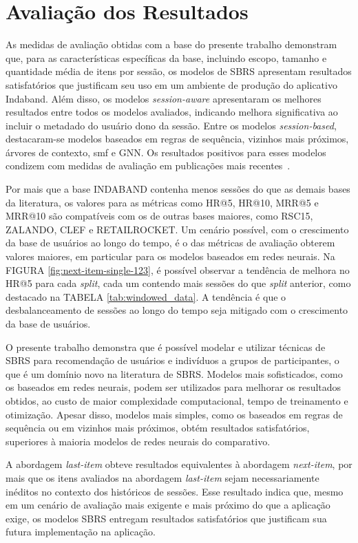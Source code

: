 \section{Avaliação dos Resultados}

As medidas de avaliação obtidas com a base do presente trabalho demonstram que,
para as características específicas da base, incluindo escopo, tamanho e
quantidade média de itens por sessão, os modelos de SBRS apresentam resultados
satisfatórios que justificam seu uso em um ambiente de produção do aplicativo
Indaband. Além disso, os modelos \textit{session-aware} apresentaram os melhores
resultados entre todos os modelos avaliados, indicando melhora significativa ao
incluir o metadado do usuário dono da sessão. Entre os modelos
\textit{session-based}, destacaram-se modelos baseados em regras de sequência,
vizinhos mais próximos, árvores de contexto, smf e GNN.  Os resultados positivos para esses modelos
condizem com medidas de avaliação em publicações mais
recentes~\cite{shehzad2024performance}.

Por mais que a base INDABAND contenha menos sessões do que as demais bases da
literatura, os valores para as métricas como HR@5, HR@10, MRR@5 e MRR@10 são
compatíveis com os de outras bases maiores, como RSC15, ZALANDO, CLEF e
RETAILROCKET. Um cenário possível, com o crescimento da base de usuários ao
longo do tempo, é o das métricas de avaliação obterem valores maiores, em
particular para os modelos baseados em redes neurais. Na FIGURA
\ref{fig:next-item-single-123}, é possível observar a tendência de melhora no
HR@5 para cada \textit{split}, cada um contendo mais sessões do que
\textit{split} anterior, como destacado na TABELA \ref{tab:windowed_data}. A
tendência é que o desbalanceamento de sessões ao longo do tempo seja mitigado
com o crescimento da base de usuários.

O presente trabalho demonstra que é possível modelar e utilizar técnicas de SBRS
para recomendação de usuários e indivíduos a grupos de participantes, o que é um
domínio novo na literatura de SBRS. Modelos mais sofisticados, como os baseados
em redes neurais, podem ser utilizados para melhorar os resultados obtidos, ao
custo de maior complexidade computacional, tempo de treinamento e otimização.
Apesar disso, modelos mais simples, como os baseados em regras de sequência ou
em vizinhos mais próximos, obtém resultados satisfatórios, superiores à maioria
modelos de redes neurais do comparativo.

A abordagem \textit{last-item} obteve resultados equivalentes à abordagem
\textit{next-item}, por mais que os itens avaliados na abordagem
\textit{last-item} sejam necessariamente inéditos no contexto dos históricos de sessões.
Esse resultado indica que, mesmo em um cenário de avaliação mais exigente e mais
próximo do que a aplicação exige, os modelos SBRS entregam resultados
satisfatórios que justificam sua futura implementação na aplicação.
